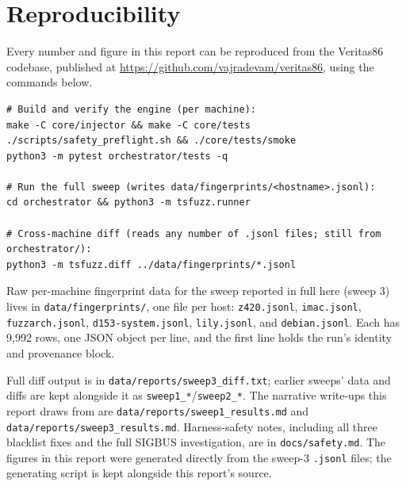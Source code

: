 \documentclass[11pt]{article}
\newcommand{\project}{Veritas86}
\begin{document}
\appendix
\section{Reproducibility}
\label{app:repro}

Every number and figure in this report can be reproduced from the
\project{} codebase, published at
\url{https://github.com/vajradevam/veritas86}, using the commands
below.

\begin{lstlisting}[style=hex]
# Build and verify the engine (per machine):
make -C core/injector && make -C core/tests
./scripts/safety_preflight.sh && ./core/tests/smoke
python3 -m pytest orchestrator/tests -q

# Run the full sweep (writes data/fingerprints/<hostname>.jsonl):
cd orchestrator && python3 -m tsfuzz.runner

# Cross-machine diff (reads any number of .jsonl files; still from orchestrator/):
python3 -m tsfuzz.diff ../data/fingerprints/*.jsonl
\end{lstlisting}

Raw per-machine fingerprint data for the sweep reported in full here
(sweep 3) lives in \texttt{data/fingerprints/}, one file per host:
\texttt{z420.jsonl}, \texttt{imac.jsonl}, \texttt{fuzzarch.jsonl},
\texttt{d153-system.jsonl}, \texttt{lily.jsonl}, and
\texttt{debian.jsonl}. Each has 9{,}992 rows, one JSON object per line,
and the first line holds the run's identity and provenance block.

Full diff output is in \texttt{data/reports/sweep3\_diff.txt}; earlier
sweeps' data and diffs are kept alongside it as
\texttt{sweep1\_*}/\texttt{sweep2\_*}. The narrative write-ups this
report draws from are \texttt{data/reports/sweep1\_results.md} and
\texttt{data/reports/sweep3\_results.md}. Harness-safety notes,
including all three blacklist fixes and the full SIGBUS investigation,
are in \texttt{docs/safety.md}. The figures in this report were
generated directly from the sweep-3 \texttt{.jsonl} files; the
generating script is kept alongside this report's source.
\end{document}
